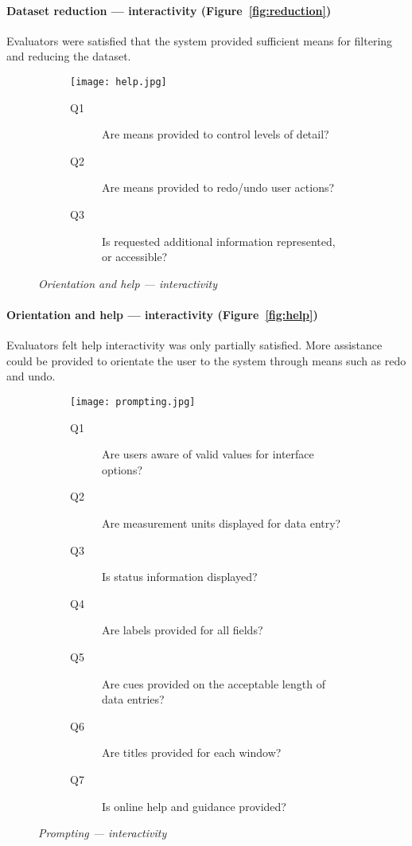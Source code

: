 \paragraph{Dataset reduction --- interactivity (Figure~\vref{fig:reduction})}

Evaluators were satisfied that the system provided sufficient means for filtering and reducing the dataset.

\begin{figure}[!htb]
\centering
\begin{subfigure}{.5\textwidth}
	\centering
	\texttt{[image: help.jpg]}
\end{subfigure}%
\begin{subfigure}{.5\textwidth}
  \begin{description}
	\item[Q1]Are means provided to control levels of detail?
	\item[Q2]Are means provided to redo/undo user actions?
	\item[Q3]Is requested additional information represented, or accessible?
  \end{description}
\end{subfigure}
\caption{\textit{Orientation and help --- interactivity }}
\label{fig:help}
\end{figure}

\paragraph{Orientation and help --- interactivity (Figure~\vref{fig:help})}

Evaluators felt help interactivity was only partially satisfied. More assistance could be provided to orientate the user to the system through means such as redo and undo. 

\begin{figure}[!htb]
\centering
\begin{subfigure}{\textwidth}
	\centering
	\texttt{[image: prompting.jpg]}
\end{subfigure}
\begin{subfigure}{\textwidth}
  \begin{description}
	\item[Q1]Are users aware of valid values for interface options?
	\item[Q2]Are measurement units displayed for data entry?
	\item[Q3]Is status information displayed?
	\item[Q4]Are labels provided for all fields?
	\item[Q5]Are cues provided on the acceptable length of data entries?
	\item[Q6]Are titles provided for each window?
	\item[Q7]Is online help and guidance provided?
  \end{description}
\end{subfigure}
\caption{\textit{Prompting --- interactivity}}
\label{fig:prompting}
\end{figure}

